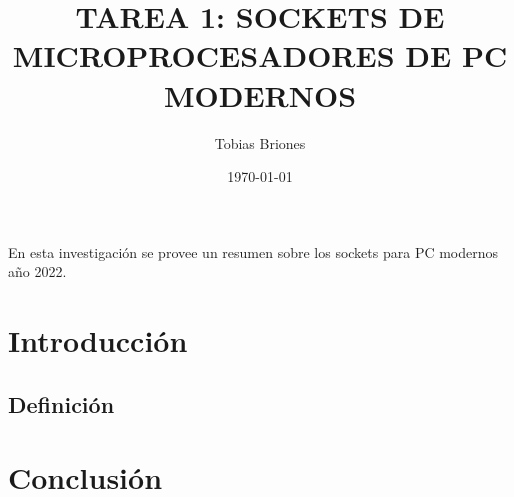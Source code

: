 \documentclass{article}
\title{TAREA 1: SOCKETS DE MICROPROCESADORES DE PC MODERNOS}
\author{Tobias Briones}
\date{\today}
\begin{document}
\maketitle

\newpage

En esta investigación se provee un resumen sobre los sockets para PC modernos año 2022.

\section{Introducción}


\subsection{Definición}


\section{Conclusión}

\printbibliography
\end{document}
